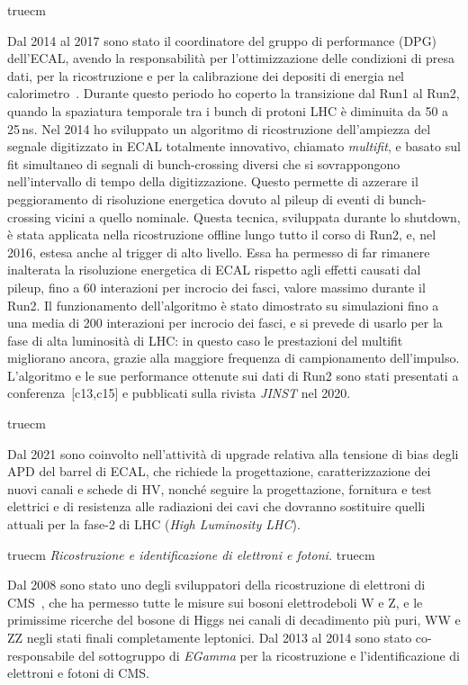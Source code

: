 \documentclass[11pt,twoside,a4paper]{article}
\begin{document}
 truecm

Dal 2014 al 2017 sono stato il coordinatore del gruppo di performance
(DPG) dell'ECAL, avendo la responsabilit\`a per l'ottimizzazione delle
condizioni di presa dati, per la ricostruzione e per la calibrazione
dei depositi di energia nel
calorimetro~\cite{Khachatryan:2015iwa}. Durante questo periodo ho
coperto la transizione dal Run1 al Run2, quando la spaziatura
temporale tra i bunch di protoni LHC \`e diminuita da 50 a 25\,ns. Nel
2014 ho sviluppato un algoritmo di ricostruzione dell'ampiezza del
segnale digitizzato in ECAL totalmente innovativo, chiamato
\textit{multifit}, e basato sul fit simultaneo di segnali di
bunch-crossing diversi che si sovrappongono nell'intervallo di tempo
della digitizzazione.  Questo permette di azzerare il peggioramento di
risoluzione energetica dovuto al pileup di eventi di bunch-crossing
vicini a quello nominale.  Questa tecnica, sviluppata durante lo
shutdown, \`e stata applicata nella ricostruzione offline lungo tutto
il corso di Run2, e, nel 2016, estesa anche al trigger di alto
livello.  Essa ha permesso di far rimanere inalterata la risoluzione
energetica di ECAL rispetto agli effetti causati dal pileup, fino a 60
interazioni per incrocio dei fasci, valore massimo durante il Run2.
Il funzionamento dell'algoritmo \`e stato dimostrato su simulazioni
fino a una media di 200 interazioni per incrocio dei fasci, e si
prevede di usarlo per la fase di alta luminosit\`a di LHC: in questo
caso le prestazioni del multifit migliorano ancora, grazie alla
maggiore frequenza di campionamento dell'impulso. L'algoritmo e le sue
performance ottenute sui dati di Run2 sono stati presentati a
conferenza~[c13,c15] e pubblicati sulla rivista \textit{JINST} nel
2020.

 truecm

Dal 2021 sono coinvolto nell'attivit\`a di upgrade relativa alla
tensione di bias degli APD del barrel di ECAL, che richiede la
progettazione, caratterizzazione dei nuovi canali e schede di HV,
nonch\'e seguire la progettazione, fornitura e test elettrici e di
resistenza alle radiazioni dei cavi che dovranno sostituire quelli
attuali per la fase-2 di LHC (\textit{High Luminosity LHC}).


 truecm
\textit{Ricostruzione e identificazione di elettroni e fotoni.}
 truecm

Dal 2008 sono stato uno degli sviluppatori della ricostruzione di
elettroni di CMS~\cite{Khachatryan:2015hwa}, che ha permesso tutte le
misure sui bosoni elettrodeboli W e Z, e le primissime ricerche del
bosone di Higgs nei canali di decadimento pi\`u puri, WW e ZZ negli
stati finali completamente leptonici. Dal 2013 al 2014 sono stato
co-responsabile del sottogruppo di \textit{EGamma} per la
ricostruzione e l'identificazione di elettroni e fotoni di CMS.
\end{document}
